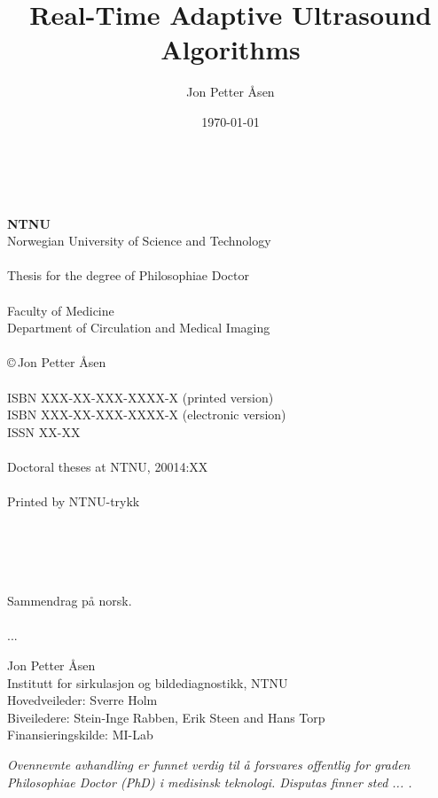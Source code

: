 \documentclass[10pt,b5paper,twoside]{book}
\author{Jon Petter \AA{}sen}
\title{%
Real-Time Adaptive Ultrasound Algorithms
\vspace{0.5cm}}
\begin{document}
\date{\today}
\pagestyle{empty} \maketitle

\newpage%
~\\
\vspace{10.0cm}
~\\
{\bf NTNU}
\\
Norwegian University of Science and Technology\\
\\
Thesis for the degree of Philosophiae Doctor\\
\\
Faculty of Medicine\\
Department of Circulation and Medical Imaging\\
\\
\copyright\,Jon Petter \AA{}sen\\
\\
ISBN XXX-XX-XXX-XXXX-X (printed version)\\
ISBN XXX-XX-XXX-XXXX-X (electronic version)\\
ISSN XX-XX\\
\\
Doctoral theses at NTNU, 20014:XX\\
\\
Printed by NTNU-trykk

~\\
\newpage
\thispagestyle{empty}%
~\\%
~\\%
~\\
\noindent\large 
Sammendrag p\aa{} norsk.
\\\\%
\normalsize
...

\vspace{0.3cm}
\noindent Jon Petter \AA{}sen\\
Institutt for sirkulasjon og bildediagnostikk, NTNU\\
Hovedveileder: Sverre Holm\\ 
Biveiledere: Stein-Inge Rabben, Erik Steen and Hans Torp\\
Finansieringskilde: MI-Lab

\vspace{0.2cm}
\noindent \emph{Ovennevnte avhandling er funnet verdig til \aa{} forsvares offentlig for graden Philosophiae Doctor (PhD) i medisinsk teknologi. Disputas finner sted ... .}
\end{document}
